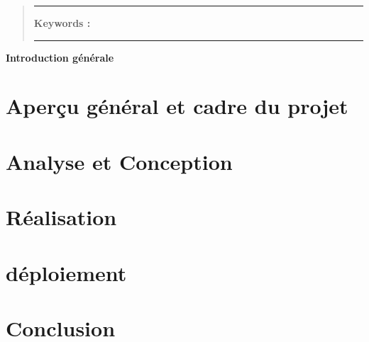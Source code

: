 \documentclass{myReport}
\begin{document}
\begin{abstract}

\vspace{1cm}


\noindent\rule[2pt]{\textwidth}{0.5pt}

{\textbf{Keywords :}}
\\ 
 
\noindent\rule[2pt]{\textwidth}{0.5pt}
\end{abstract}

\newpage

\tableofcontents
\listoffigures
\newpage
{}
\vspace*{2cm}
\begin{center}
    {\LARGE \textbf{Introduction générale}}
\end{center}
\vspace{2cm}


\newpage
\makeheader
\chapter{Aperçu général et cadre du projet}

\chapter{Analyse et Conception}


\chapter{Réalisation}

\chapter{déploiement}

\chapter{Conclusion}







\nocite{*} 
 
\renewcommand{\bibname}{Ressources} 
 
\thispagestyle{empty}
\end{document}
